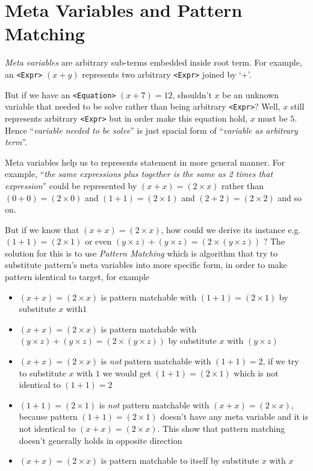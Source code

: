 \documentclass[master.tex]{subfiles}
\begin{document}
\hspace{2ex}

\section{Meta Variables and Pattern Matching}

\emph{Meta variables} are arbitrary sub-terms embedded inside root term. For
example, an \texttt{<Expr>} $(x + y)$ represents two arbitrary \texttt{<Expr>}
joined by `$+$'.

But if we have an \texttt{<Equation>} $(x + 7) = 12$, shouldn't $x$ be an unknown
variable that needed to be solve rather than being arbitrary \texttt{<Expr>}?
Well, $x$ still represents arbitrary \texttt{<Expr>} but in order make this
equation hold, $x$ must be $5$. Hence ``\emph{variable needed to be solve}'' is
just spacial form of ``\emph{variable as arbitrary term}''.

Meta variables help us to represents statement in more general manner. For
example, ``\emph{the same expressions plus together is the same as 2 times that
  expression}'' could be represented by $(x + x) = (2 \times x)$ rather than $(0 + 0)
= (2 \times 0)$ and $(1 + 1) = (2 \times 1)$ and $(2 + 2) = (2 \times 2)$ and so on.

But if we know that $(x + x) = (2 \times x)$, how could we derive its instance e.g.
$(1 + 1) = (2 \times 1)$ or even $(y \times z) + (y \times z) = (2 \times (y \times z))$ ?
The solution for this is to use \emph{Pattern Matching} which is algorithm that
try to substitute pattern's meta variables into more specific form, in order to
make pattern identical to target, for example
\begin{itemize}
\item $(x + x) = (2 \times x)$ is pattern matchable with $(1 + 1) = (2 \times 1)$ by
  substitute $x$ with$1$
\item $(x + x) = (2 \times x)$ is pattern matchable with $(y \times z) + (y
  \times z) = (2 \times (y \times z))$ by substitute $x$ with $(y \times z)$
\item $(x + x) = (2 \times x)$ is \emph{not} pattern matchable with $(1 + 1) = 2$, if
  we try to substitute $x$ with $1$ we would get $(1 + 1) = (2 \times 1)$ which is not
  identical to $(1 + 1) = 2$
\item $(1 + 1) = (2 \times 1)$ is \emph{not} pattern matchable with $(x + x) =
  (2 \times x)$, because pattern $(1 + 1) = (2 \times 1)$ doesn't have any meta
  variable and it is not identical to $(x + x) = (2 \times x)$. This show that
  pattern matching doesn't generally holds in opposite direction
\item $(x + x) = (2 \times x)$ is pattern matchable to itself by substitute $x$ with $x$
\end{itemize}
\end{document}
